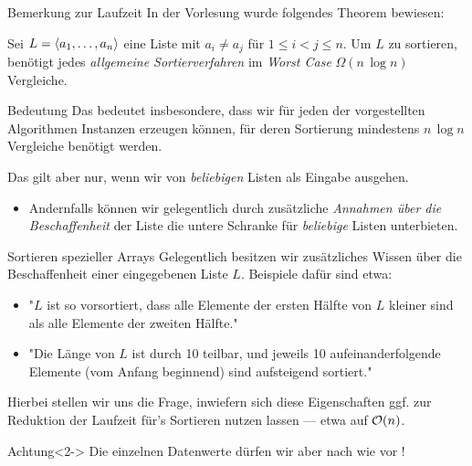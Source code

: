 \begin{frame}{Bemerkung zur Laufzeit}
In der Vorlesung wurde folgendes Theorem bewiesen:

\begin{theorem}\label{sort:thm:bound}
Sei $L = \langle a_1, \dots, a_n\rangle$ eine Liste mit $a_i \neq a_j$ f\"ur $1 \leq i < j \leq n$.
Um $L$ zu sortieren, ben\"otigt jedes \emph{allgemeine Sortierverfahren} im \emph{Worst Case} $\Omega(n \, \log n)$ Vergleiche.
\end{theorem}

\begin{block}{Bedeutung}
Das bedeutet insbesondere, dass wir f\"ur jeden der vorgestellten Algorithmen Instanzen erzeugen k\"onnen, f\"ur deren Sortierung mindestens $n \, \log n$ Vergleiche ben\"otigt werden.

Das gilt aber nur, wenn wir von \emph{beliebigen} Listen als Eingabe ausgehen.
\begin{itemize}
    \item Andernfalls k\"onnen wir gelegentlich durch zus\"atzliche \emph{Annahmen \"uber die Beschaffenheit} der Liste die untere Schranke f\"ur \emph{beliebige} Listen unterbieten.
\end{itemize}
\end{block}
\end{frame}

\begin{frame}{Sortieren spezieller Arrays}
Gelegentlich besitzen wir zus\"atzliches Wissen \"uber die Beschaffenheit einer eingegebenen Liste $L$.
Beispiele daf\"ur sind etwa:
\begin{itemize}
    \item "$L$ ist so vorsortiert, dass alle Elemente der ersten Hälfte von $L$ kleiner sind als alle Elemente der zweiten Hälfte."
    \item "Die Länge von $L$ ist durch 10 teilbar, und jeweils 10 aufeinanderfolgende Elemente (vom Anfang beginnend) sind aufsteigend sortiert."
\end{itemize}
Hierbei stellen wir uns die Frage, inwiefern sich diese Eigenschaften ggf. zur Reduktion der Laufzeit f\"ur's Sortieren nutzen lassen --- etwa auf $\mathcal{O}(n)$.

\begin{alertblock}{Achtung}<2->
Die einzelnen Datenwerte d\"urfen wir aber nach wie vor !
\end{alertblock}
\end{frame}

